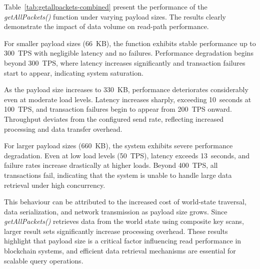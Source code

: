 \documentclass[12pt]{article}
\begin{document}
	
	
	
	
	
	
	
	Table~\ref{tab:getallpackets-combined} present the performance of the \textit{getAllPackets()} function under varying payload sizes. The results clearly demonstrate the impact of data volume on read-path performance.
	
	For smaller payload sizes (66~KB), the function exhibits stable performance up to 300~TPS with negligible latency and no failures. Performance degradation begins beyond 300~TPS, where latency increases significantly and transaction failures start to appear, indicating system saturation.
	
	As the payload size increases to 330~KB, performance deteriorates considerably even at moderate load levels. Latency increases sharply, exceeding 10~seconds at 100~TPS, and transaction failures begin to appear from 200~TPS onward. Throughput deviates from the configured send rate, reflecting increased processing and data transfer overhead.
	
	For larger payload sizes (660~KB), the system exhibits severe performance degradation. Even at low load levels (50~TPS), latency exceeds 13~seconds, and failure rates increase drastically at higher loads. Beyond 400~TPS, all transactions fail, indicating that the system is unable to handle large data retrieval under high concurrency.
	
	This behaviour can be attributed to the increased cost of world-state traversal, data serialization, and network transmission as payload size grows. Since \textit{getAllPackets()} retrieves data from the world state using composite key scans, larger result sets significantly increase processing overhead. These results highlight that payload size is a critical factor influencing read performance in blockchain systems, and efficient data retrieval mechanisms are essential for scalable query operations.	
	
\end{document}
